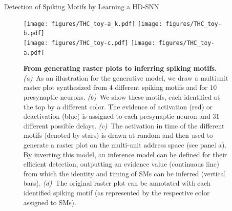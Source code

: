 \documentclass[final]{beamer}
\newlength{\colwidth}
\begin{document}
\begin{frame}[t]
\begin{columns}[t]
\begin{column}{\colwidth}
  \begin{exampleblock}{Detection of Spiking Motifs by Learning a HD-SNN~\parencite{Perrinet23ICANN}}

%
%
%
%
%
%
%
\begin{figure}%
  \texttt{[image: figures/THC\_toy-a\_k.pdf]}
  \texttt{[image: figures/THC\_toy-b.pdf]}
  \\
  \texttt{[image: figures/THC\_toy-c.pdf]}
  \texttt{[image: figures/THC\_toy-a.pdf]} 
\caption{\textbf{From generating raster plots to inferring spiking motifs}. \textit{(a)}~As an illustration for the generative model, we draw a multiunit raster plot synthesized from $4$ different spiking motifs and for $10$ presynaptic neurons. \textit{(b)}~We show these motifs, each identified at the top by a different color. The evidence of activation (red) or deactivation (blue) is assigned to each presynaptic neuron and $31$ different possible delays. \textit{(c)}~The activation in time of the different motifs (denoted by stars) is drawn at random and then used to generate a raster plot on the multi-unit address space (see panel a). By inverting this model, an inference model can be defined for their efficient detection, outputting an evidence value (continuous line) from which the identity and timing of SMs can be inferred (vertical bars). \textit{(d)}~The original raster plot can be annotated with each identified spiking motif (as represented by the respective color assigned to SMs).
}
\label{fig:THC}
\end{figure}
  \end{exampleblock}


\end{column}
\end{columns}
\end{frame}
\end{document}
